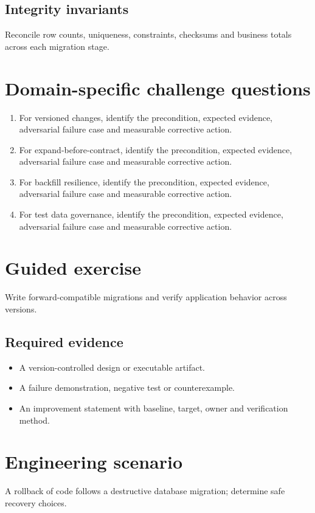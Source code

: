 \documentclass[10pt,letterpaper]{article}
\begin{document}
\subsection{Integrity invariants}
Reconcile row counts, uniqueness, constraints, checksums and business totals across each migration stage.

\section{Domain-specific challenge questions}
\begin{enumerate}
\item For versioned changes, identify the precondition, expected evidence, adversarial failure case and measurable corrective action.
\item For expand-before-contract, identify the precondition, expected evidence, adversarial failure case and measurable corrective action.
\item For backfill resilience, identify the precondition, expected evidence, adversarial failure case and measurable corrective action.
\item For test data governance, identify the precondition, expected evidence, adversarial failure case and measurable corrective action.
\end{enumerate}
\section{Guided exercise}
Write forward-compatible migrations and verify application behavior across versions.

\subsection{Required evidence}
\begin{itemize}
\item A version-controlled design or executable artifact.
\item A failure demonstration, negative test or counterexample.
\item An improvement statement with baseline, target, owner and verification method.
\end{itemize}


\section{Engineering scenario}
A rollback of code follows a destructive database migration; determine safe recovery choices.
\end{document}
